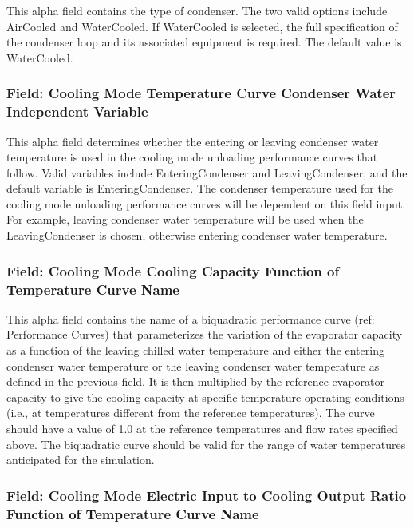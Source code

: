 This alpha field contains the type of condenser.  The two valid options include AirCooled and WaterCooled. If WaterCooled is selected, the full specification of the condenser loop and its associated equipment is required. The default value is WaterCooled.

\subsubsection{Field: Cooling Mode Temperature Curve Condenser Water Independent Variable}\label{field-cooling-mode-temperature-curve-condenser-water-independent-variable}

This alpha field determines whether the entering or leaving condenser water temperature is used in the cooling mode unloading performance curves that follow. Valid variables include EnteringCondenser and LeavingCondenser, and the default variable is EnteringCondenser. The condenser temperature used for the cooling mode unloading performance curves will be dependent on this field input. For example, leaving condenser water temperature will be used when the LeavingCondenser is chosen, otherwise entering condenser water temperature.

\subsubsection{Field: Cooling Mode Cooling Capacity Function of Temperature Curve Name}\label{field-cooling-mode-cooling-capacity-function-of-temperature-curve-name}

This alpha field contains the name of a biquadratic performance curve (ref: Performance Curves) that parameterizes the variation of the evaporator capacity as a function of the leaving chilled water temperature and either the entering condenser water temperature or the leaving condenser water temperature as defined in the previous field. It is then multiplied by the reference evaporator capacity to give the cooling capacity at specific temperature operating conditions (i.e., at temperatures different from the reference temperatures). The curve should have a value of 1.0 at the reference temperatures and flow rates specified above. The biquadratic curve should be valid for the range of water temperatures anticipated for the simulation.

\subsubsection{Field: Cooling Mode Electric Input to Cooling Output Ratio Function of Temperature Curve Name}\label{field-cooling-mode-electric-input-to-cooling-output-ratio-function-of-temperature-curve-name}

